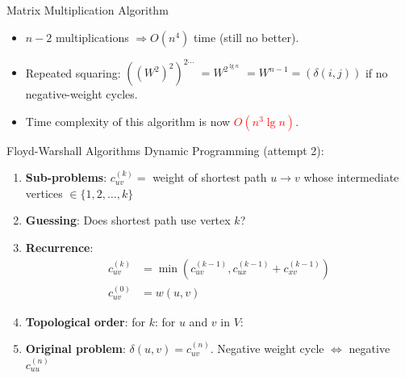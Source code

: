 \documentclass{beamer}
\begin{document}
\begin{frame}{Matrix Multiplication Algorithm}
    \begin{itemize}
        \item $n - 2$ multiplications $\Rightarrow O(n^4)$ time (still no better). \pause
        \item Repeated squaring: $((W^2)^2)^{2 \cdots}$ \pause $= W^{2^{\lg n}}$ \pause $= W^{n - 1} = (\delta(i, j))$ if no negative-weight cycles. \pause
        \item Time complexity of this algorithm is now \textcolor{red}{$O(n^3 \lg n)$}.
    \end{itemize}
\end{frame}


\begin{frame}{Floyd-Warshall Algorithms}
    Dynamic Programming (attempt 2):
    \begin{enumerate}
        \item \textbf{Sub-problems}: $c_{uv}^{(k)} =$ weight of shortest path $u \rightarrow v$ whose intermediate vertices $\in \{1,2, \ldots, k\}$
        \item \textbf{Guessing}: Does shortest path use vertex $k$?
        \item \textbf{Recurrence}:
        \begin{equation*}
            \begin{align*}
                c_{uv}^{(k)} &= \min(c_{uv}^{(k-1)}, c_{ux}^{(k-1)} + c_{xv}^{(k-1)}) \\
                c_{uv}^{(0)} &= w(u, v)
            \end{align*}
        \end{equation*}
        \item \textbf{Topological order}: for $k$: for $u$ and $v$ in $V$:
        \item \textbf{Original problem}: $\delta(u, v) = c_{uv}^{(n)}$. Negative weight cycle $\Leftrightarrow$ negative $c_{uu}^{(n)}$
    \end{enumerate}
\end{frame}



















\begin{frame}{}
\end{frame}
\end{document}
